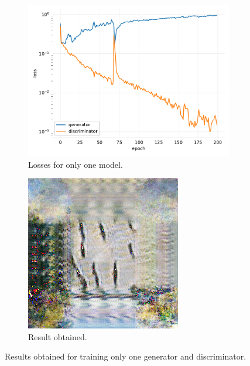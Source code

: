 \documentclass[twocolumn,superscriptaddress,aps,floatfix,nofootinbib]{revtex4-1}
\begin{document}
    \begin{figure}[H]
        \centering
        \begin{subfigure}[b]{0.22\textwidth}
            \centering
            \includegraphics[width=\textwidth]{resources/png/gan-losses/one1.pdf}
            \caption{Losses for only one model.}
        \end{subfigure}
        \hfill
        \begin{subfigure}[b]{0.22\textwidth}
            \centering
            \includegraphics[width=\textwidth]{resources/png/gan-results/test_one.png}
            \caption{Result obtained.}
            \label{fig:one1}
        \end{subfigure}
        \caption{Results obtained for training only one generator and discriminator.}
    \end{figure}
    
\end{document}
